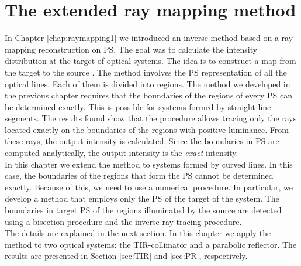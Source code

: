 \chapter{The extended ray mapping method}
\label{chap:raymapping2}
In Chapter \ref{chap:raymapping1} we introduced an inverse method based on a ray mapping reconstruction on PS.
The goal was to calculate the intensity distribution at the target of optical systems. 
The idea is to construct a map from the target  to the source . 
The method involves the PS representation of all the optical lines. Each of them is divided into regions.  
The method we developed in the previous chapter requires that the boundaries of the regions of every PS can be determined exactly. This is possible for systems formed by straight line segments.
The results found show that the procedure allows tracing only the rays located exactly on the boundaries of the regions with positive luminance. From these rays, the output intensity is calculated. Since the boundaries in PS are computed analytically, the output intensity is the \textit{exact} intensity. \\ \indent
In this chapter we extend the method to systems formed by curved lines. In this case, the boundaries of the regions that form the PS cannot be determined exactly.
Because of this, we need to use a numerical procedure. In particular, we develop a method that employs only the PS of the target of the system. 
The boundaries in target PS of the regions illuminated by the source are detected using a bisection procedure and the inverse ray tracing procedure.\\ \indent
The details are explained in the next section. In this chapter we apply the method to two optical systems: the TIR-collimator and a parabolic reflector. The results are presented in Section \ref{sec:TIR} and \ref{sec:PR}, respectively.

